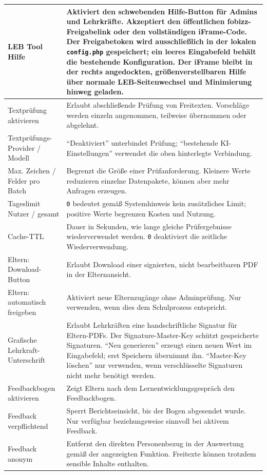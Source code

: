 \documentclass[12pt,a4paper]{article}
\begin{document}
\begin{longtable}{|p{}|p{}|}
\hline
LEB Tool Hilfe & Aktiviert den schwebenden Hilfe-Button für Admins und Lehrkräfte. Akzeptiert den öffentlichen fobizz-Freigabelink oder den vollständigen iFrame-Code. Der Freigabetoken wird ausschließlich in der lokalen \texttt{config.php} gespeichert; ein leeres Eingabefeld behält die bestehende Konfiguration. Der iFrame bleibt in der rechts angedockten, größenverstellbaren Hilfe über normale LEB-Seitenwechsel und Minimierung hinweg geladen.\\
\hline
Textprüfung aktivieren & Erlaubt abschließende Prüfung von Freitexten. Vorschläge werden einzeln angenommen, teilweise übernommen oder abgelehnt.\\
\hline
Textprüfungs-Provider / Modell & \enquote{Deaktiviert} unterbindet Prüfung; \enquote{bestehende KI-Einstellungen} verwendet die oben hinterlegte Verbindung.\\
\hline
Max. Zeichen / Felder pro Batch & Begrenzt die Größe einer Prüfanforderung. Kleinere Werte reduzieren einzelne Datenpakete, können aber mehr Anfragen erzeugen.\\
\hline
Tageslimit Nutzer / gesamt & \texttt{0} bedeutet gemäß Systemhinweis kein zusätzliches Limit; positive Werte begrenzen Kosten und Nutzung.\\
\hline
Cache-TTL & Dauer in Sekunden, wie lange gleiche Prüfergebnisse wiederverwendet werden. \texttt{0} deaktiviert die zeitliche Wiederverwendung.\\
\hline
Eltern: Download-Button & Erlaubt Download einer signierten, nicht bearbeitbaren PDF in der Elternansicht.\\
\hline
Eltern: automatisch freigeben & Aktiviert neue Elternzugänge ohne Adminprüfung. Nur verwenden, wenn dies dem Schulprozess entspricht.\\
\hline
Grafische Lehrkraft-Unterschrift & Erlaubt Lehrkräften eine handschriftliche Signatur für Eltern-PDFs. Der Signature-Master-Key schützt gespeicherte Signaturen. \enquote{Neu generieren} erzeugt einen neuen Wert im Eingabefeld; erst Speichern übernimmt ihn. \enquote{Master-Key löschen} nur verwenden, wenn verschlüsselte Signaturen nicht mehr benötigt werden.\\
\hline
Feedbackbogen aktivieren & Zeigt Eltern nach dem Lernentwicklungsgespräch den Feedbackbogen.\\
\hline
Feedback verpflichtend & Sperrt Berichtseinsicht, bis der Bogen abgesendet wurde. Nur verfügbar beziehungsweise sinnvoll bei aktivem Feedback.\\
\hline
Feedback anonym & Entfernt den direkten Personenbezug in der Auswertung gemäß der angezeigten Funktion. Freitexte können trotzdem sensible Inhalte enthalten.\\

\end{longtable}
\end{document}
